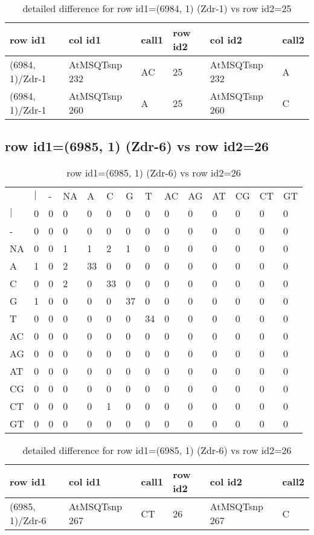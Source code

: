 \begin{center}
\begin{longtable}{|l|l|l|l|l|l|}
\caption{detailed difference for row id1=(6984, 1) (Zdr-1) vs row id2=25} \label{table_dm217}\\
\hline
row id1&col id1&call1&row id2&col id2&call2\\
\hline
(6984, 1)/Zdr-1&AtMSQTsnp 232&AC&25&AtMSQTsnp 232&A\\
(6984, 1)/Zdr-1&AtMSQTsnp 260&A&25&AtMSQTsnp 260&C\\
\hline
\end{longtable}
\end{center}

\subsection{row id1=(6985, 1) (Zdr-6) vs row id2=26}
\begin{center}
\begin{longtable}{|l|l|l|l|l|l|l|l|l|l|l|l|l|l|}
\caption{row id1=(6985, 1) (Zdr-6) vs row id2=26} \label{table_dm218}\\
\hline
\\
\hline
&$|$&-&NA&A&C&G&T&AC&AG&AT&CG&CT&GT\\
$|$&0&0&0&0&0&0&0&0&0&0&0&0&0\\
-&0&0&0&0&0&0&0&0&0&0&0&0&0\\
NA&0&0&1&1&2&1&0&0&0&0&0&0&0\\
A&1&0&2&33&0&0&0&0&0&0&0&0&0\\
C&0&0&2&0&33&0&0&0&0&0&0&0&0\\
G&1&0&0&0&0&37&0&0&0&0&0&0&0\\
T&0&0&0&0&0&0&34&0&0&0&0&0&0\\
AC&0&0&0&0&0&0&0&0&0&0&0&0&0\\
AG&0&0&0&0&0&0&0&0&0&0&0&0&0\\
AT&0&0&0&0&0&0&0&0&0&0&0&0&0\\
CG&0&0&0&0&0&0&0&0&0&0&0&0&0\\
CT&0&0&0&0&1&0&0&0&0&0&0&0&0\\
GT&0&0&0&0&0&0&0&0&0&0&0&0&0\\
\hline
\end{longtable}
\end{center}

\begin{center}
\begin{longtable}{|l|l|l|l|l|l|}
\caption{detailed difference for row id1=(6985, 1) (Zdr-6) vs row id2=26} \label{table_dm219}\\
\hline
row id1&col id1&call1&row id2&col id2&call2\\
\hline
(6985, 1)/Zdr-6&AtMSQTsnp 267&CT&26&AtMSQTsnp 267&C\\
\hline
\end{longtable}
\end{center}

